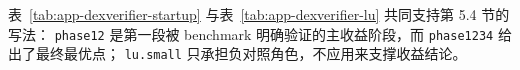 表~\ref{tab:app-dexverifier-startup} 与表~\ref{tab:app-dexverifier-lu} 共同支持第 5.4 节的写法：
\texttt{phase12} 是第一段被 benchmark 明确验证的主收益阶段，而 \texttt{phase1234} 给出了最终最优点；
\texttt{lu.small} 只承担负对照角色，不应用来支撑收益结论。

